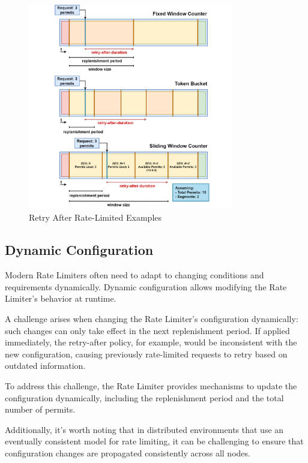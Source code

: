 \begin{figure}[!htb]
    \centering
    \includegraphics[width=0.8\textwidth]{../figures/06_retry-after-rate-limited}
    \caption{Retry After Rate-Limited Examples}
    \label{fig:rate-limiter-retry-after}
\end{figure}

\subsection{Dynamic Configuration}\label{subsec:rate-limiter-dynamic-configuration}

Modern Rate Limiters often need to adapt to changing conditions and requirements dynamically.
Dynamic configuration allows modifying the Rate Limiter's behavior at runtime.

A challenge arises when changing the Rate Limiter's configuration dynamically: such changes can only take effect in
the next replenishment period.
If applied immediately, the retry-after policy, for example, would be inconsistent with the new configuration,
causing previously rate-limited requests to retry based on outdated information.

To address this challenge, the Rate Limiter provides mechanisms to update the configuration dynamically, including the
replenishment period and the total number of permits.

Additionally, it's worth noting that in distributed environments that use an eventually consistent model for rate limiting,
it can be challenging to ensure that configuration changes are propagated consistently across all nodes.

